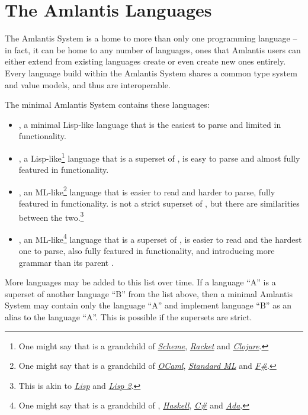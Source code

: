 \newpage

\section{The Amlantis Languages}
\label{sec:amlantis-languages}

The Amlantis System is a home to more than only one programming language -- in fact, it can be home to any number of languages, ones that Amlantis users can either extend from existing languages create or even create new ones entirely. Every language build within the Amlantis System shares a common type system and value models, and thus are interoperable.

The minimal Amlantis System contains these languages:

\begin{itemize}
  \item \AmlKernel, a minimal Lisp-like language that is the easiest to parse and limited in functionality.
  
  \item \AmlBase, a Lisp-like\footnote{One might say that \AmlBase is a grandchild of \href{https://www.scheme.org/}{{\em Scheme}}, \href{https://racket-lang.org/}{{\em Racket}} and \href{https://clojure.org}{{\em Clojure}}.} language that is a superset of \AmlKernel, is easy to parse and almost fully featured in functionality.
  
  \item \AmlCore, an ML-like\footnote{One might say that \AmlCore is a grandchild of \href{https://ocaml.org/}{{\em OCaml}}, \href{https://smlfamily.github.io/}{{\em Standard ML}} and \href{https://fsharp.org/}{{\em F\#}}.} language that is easier to read and harder to parse, fully featured in functionality. \AmlCore is not a strict superset of \AmlBase, but there are similarities between the two.\footnote{This is akin to \href{https://en.wikipedia.org/wiki/Lisp_(programming_language)}{{\em Lisp}} and \href{https://en.wikipedia.org/wiki/LISP_2}{{\em Lisp 2}}.}
  
  \item \Aml, an ML-like\footnote{One might say that \Aml is a grandchild of \AmlCore, \href{https://www.haskell.org/}{{\em Haskell}}, \href{https://learn.microsoft.com/en-us/dotnet/csharp/}{{\em C\#}} and \href{https://www.adaic.org/}{{\em Ada}}.} language that is a superset of \AmlCore, is easier to read and the hardest one to parse, also fully featured in functionality, and introducing more grammar than its parent \AmlCore.
  
\end{itemize}

More languages may be added to this list over time. If a language ``A'' is a superset of another language ``B'' from the list above, then a minimal Amlantis System may contain only the language ``A'' and implement language ``B'' as an alias to the language ``A''. This is possible if the supersets are strict. 







